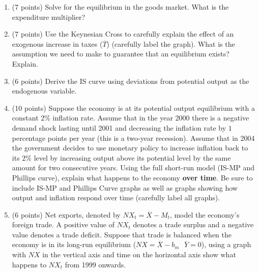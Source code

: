 \documentclass[letterpaper,12pt]{article}
\theoremstyle{dotlessS}
\begin{document}
\begin{enumerate}[label=(\alph*)]
\item (7 points) Solve for the equilibrium in the goods market. What is the expenditure multiplier? 
\item (7 points) Use the Keynesian Cross to carefully explain the effect of an exogenous increase in taxes ($\overline{T}$) (carefully label the graph). What is the assumption we need to make to guarantee that an equilibrium exists? Explain.
\item (6 points) Derive the IS curve using deviations from potential output as the endogenous variable.
\item (10 points) Suppose the economy is at its potential output equilibrium with a constant $2\%$ inflation rate. Assume that in the year 2000 there is a negative demand shock lasting until 2001 and decreasing the inflation rate by $1$ percentage points per year (this is a two-year recession). Assume that in 2004 the government decides to use monetary policy to increase  inflation back to its $2\%$ level by increasing output above its potential level by the same amount for two consecutive years. Using the full short-run model (IS-MP and Phillips curve), explain what happens to the economy \textbf{over time}. Be sure to include IS-MP and Phillips Curve graphs as well as graphs showing how output and inflation respond over time (carefully label all graphs).
\item (6 points) Net exports, denoted by $NX_t=\overline{X}-M_t$, model the economy's foreign trade. A positive value of $NX_t$ denotes a trade surplus and a negative value denotes a trade deficit. Suppose that trade is balanced when the economy is in its long-run equilibrium ($NX=\overline{X}-b_m \: \: \: \overline{Y}=0$), using a graph with $NX$ in the vertical axis and time on the horizontal axis show what happens to $NX_t$ from 1999 onwards.
\end{enumerate}   
\end{document}
